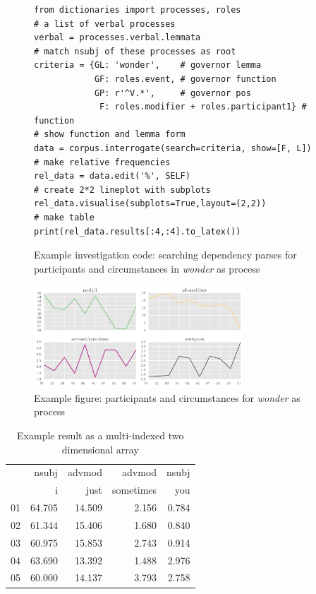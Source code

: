 \begin{figure}[H]
\begin{verbatim}
from dictionaries import processes, roles
# a list of verbal processes
verbal = processes.verbal.lemmata
# match nsubj of these processes as root
criteria = {GL: 'wonder',    # governor lemma
            GF: roles.event, # governor function
            GP: r'^V.*',     # governor pos
             F: roles.modifier + roles.participant1} # function
# show function and lemma form
data = corpus.interrogate(search=criteria, show=[F, L])
# make relative frequencies
rel_data = data.edit('%', SELF)
# create 2*2 lineplot with subplots
rel_data.visualise(subplots=True,layout=(2,2))
# make table
print(rel_data.results[:4,:4].to_latex())
\end{verbatim}
\FloatBarrier
\caption[Example investigation code]{Example investigation code: searching dependency parses for participants and circumstances in \emph{wonder} as process}
\label{fig:wonder-code}
\end{figure}

\begin{figure}[H]
\centering
\includegraphics[width=0.70\textwidth]{../images/wonder-example.png}
\caption[Example figure]{Example figure: participants and circumstances for \emph{wonder} as process}
\label{fig:wonder_example_fig}
\end{figure}

\begin{table}[H]
\footnotesize
\begin{tabular}{lrrrr}

\toprule
{} &    nsubj &  advmod &  advmod &  nsubj \\
{} &    i &  just &  sometimes &  you \\
\midrule
01 &  64.705 &  14.509 &  2.156 &  0.784  \\
02 &  61.344 &  15.406 &  1.680 &  0.840  \\
03 &  60.975 &  15.853 &  2.743 &  0.914  \\
04 &  63.690 &  13.392 &  1.488 &  2.976  \\
05 &  60.000 &  14.137 &  3.793 &  2.758  \\
\bottomrule
\end{tabular}
\caption[Example result]{Example result as a multi\hyp{}indexed two dimensional array}
\end{table}

